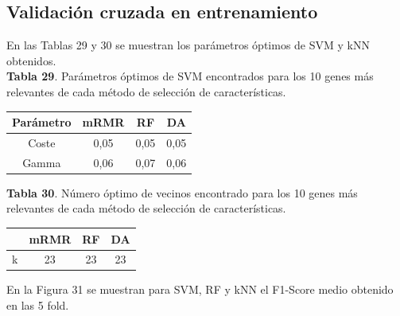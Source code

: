 \subsection{Validación cruzada en entrenamiento}

En las Tablas 29 y 30 se muestran los parámetros óptimos de SVM y kNN obtenidos.\\

\textbf{Tabla 29}. Parámetros óptimos de SVM encontrados para los 10 genes más relevantes de cada método de selección de características.

\begin{table}[H]
	\centering
	\begin{tabular}{cccc}
		\hline
		\textbf{Parámetro} & \textbf{mRMR} & \textbf{RF} & \textbf{DA} \\ \hline
		Coste                &    0,05 &    0,05     &  0,05       \\
		Gamma               &     0,06    &     0,07   & 0,06        \\ \hline
	\end{tabular}
\end{table}

\textbf{Tabla 30}. Número óptimo de vecinos encontrado para los 10 genes más relevantes de cada método de selección de características.

\begin{table}[H]
	\centering
	\begin{tabular}{cccc}
		\cline{2-4}
		\textbf{} & \textbf{mRMR} & \textbf{RF} & \textbf{DA} \\ \hline
		k                &   23 &   23     &   23      \\ \hline
	\end{tabular}
\end{table}

En la Figura 31 se muestran para SVM, RF y kNN el F1-Score medio obtenido en las 5 fold.\\

